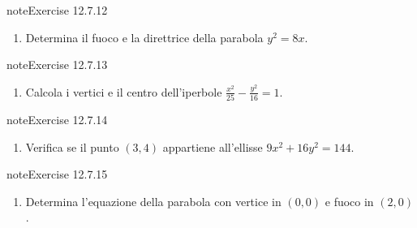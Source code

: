 \documentclass[letterpaper,10pt,italian]{jupyterBook}
\begin{document}
\begin{sphinxadmonition}{note}{Exercise 12.7.12}


\begin{enumerate}
%
\setcounter{enumi}{11}
\item {} 
\sphinxAtStartPar
Determina il fuoco e la direttrice della parabola \( y^2 = 8x \).

\end{enumerate}
\end{sphinxadmonition}
 \label{exercise:ch/analytic_geometry/analytic_geometry_2d/sol-exercise-12}

\begin{sphinxadmonition}{note}{Exercise 12.7.13}


\begin{enumerate}
%
\setcounter{enumi}{12}
\item {} 
\sphinxAtStartPar
Calcola i vertici e il centro dell’iperbole \( \frac{x^2}{25} - \frac{y^2}{16} = 1 \).

\end{enumerate}
\end{sphinxadmonition}
 \label{exercise:ch/analytic_geometry/analytic_geometry_2d/sol-exercise-13}

\begin{sphinxadmonition}{note}{Exercise 12.7.14}


\begin{enumerate}
%
\setcounter{enumi}{13}
\item {} 
\sphinxAtStartPar
Verifica se il punto \( (3, 4) \) appartiene all’ellisse \( 9x^2 + 16y^2 = 144 \).

\end{enumerate}
\end{sphinxadmonition}
 \label{exercise:ch/analytic_geometry/analytic_geometry_2d/sol-exercise-14}

\begin{sphinxadmonition}{note}{Exercise 12.7.15}


\begin{enumerate}
%
\setcounter{enumi}{14}
\item {} 
\sphinxAtStartPar
Determina l’equazione della parabola con vertice in \( (0, 0) \) e fuoco in \( (2, 0) \).

\end{enumerate}
\end{sphinxadmonition}
\end{document}
